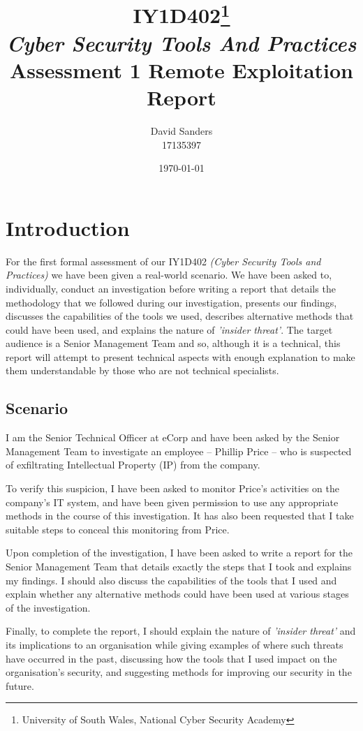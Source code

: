 \documentclass[12pt]{report}
\title{IY1D402\thanks{University of South Wales, National Cyber Security Academy}\\{\textit{\small Cyber Security Tools And Practices}}\\Assessment 1 Remote Exploitation Report}
\author{David Sanders\\{\LARGE 17135397}}
\date{\today}
\begin{document}
\maketitle
\pagebreak
% 
\tableofcontents

\pagebreak
\chapter{Introduction}
For the first formal assessment of our IY1D402 \textit{(Cyber Security Tools and Practices)} we have been given a real-world scenario. We have been asked to, individually, conduct an investigation before writing a report that details the methodology that we followed during our investigation, presents our findings, discusses the capabilities of the tools we used, describes alternative methods that could have been used, and explains the nature of \textit{'insider threat'}. The target audience is a Senior Management Team and so, although it is a technical, this report will attempt to present technical aspects with enough explanation to make them understandable by those who are not technical specialists.

\section{Scenario}
I am the Senior Technical Officer at eCorp and have been asked by the Senior Management Team to investigate an employee -- Phillip Price -- who is suspected of exfiltrating Intellectual Property (IP) from the company.

To verify this suspicion, I have been asked to monitor Price's activities on the company's IT system, and have been given permission to use any appropriate methods in the course of this investigation. It has also been requested that I take suitable steps to conceal this monitoring from Price.

Upon completion of the investigation, I have been asked to write a report for the Senior Management Team that details exactly the steps that I took and explains my findings. I should also discuss the capabilities of the tools that I used and explain whether any alternative methods could have been used at various stages of the investigation.

Finally, to complete the report, I should explain the nature of \textit{'insider threat'} and its implications to an organisation while giving examples of where such threats have occurred in the past, discussing how the tools that I used impact on the organisation's security, and suggesting methods for improving our security in the future.
\end{document}
